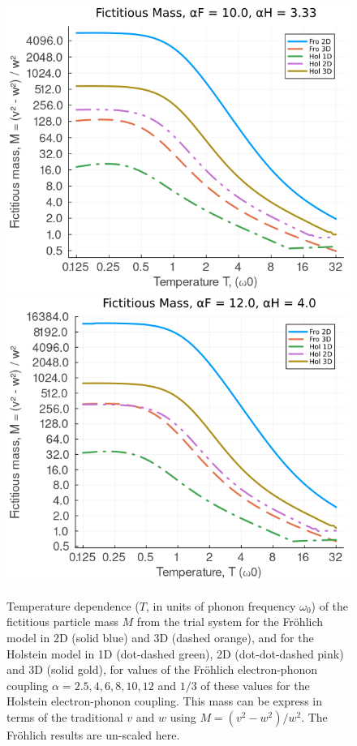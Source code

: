 \begin{figure}[!tbp]
    \includegraphics[width=.49\textwidth]{figures/mass_temp_10_333.png}
    \includegraphics[width=.49\textwidth]{figures/mass_temp_12_4.png}
    \caption{Temperature dependence ($T$, in units of phonon frequency $\omega_0$) of the fictitious particle mass $M$ from the trial system for the Fr\"ohlich model in 2D (solid blue) and 3D (dashed orange), and for the Holstein model in 1D (dot-dashed green), 2D (dot-dot-dashed pink) and 3D (solid gold), for values of the Fr\"ohlich electron-phonon coupling $\alpha = 2.5, 4, 6, 8, 10, 12$ and $1/3$ of these values for the Holstein electron-phonon coupling. This mass can be express in terms of the traditional $v$ and $w$ using $M = (v^2 - w^2) / w^2$. The Fr\"ohlich results are un-scaled here.}
    \label{fig:mass_temp}
\end{figure}

